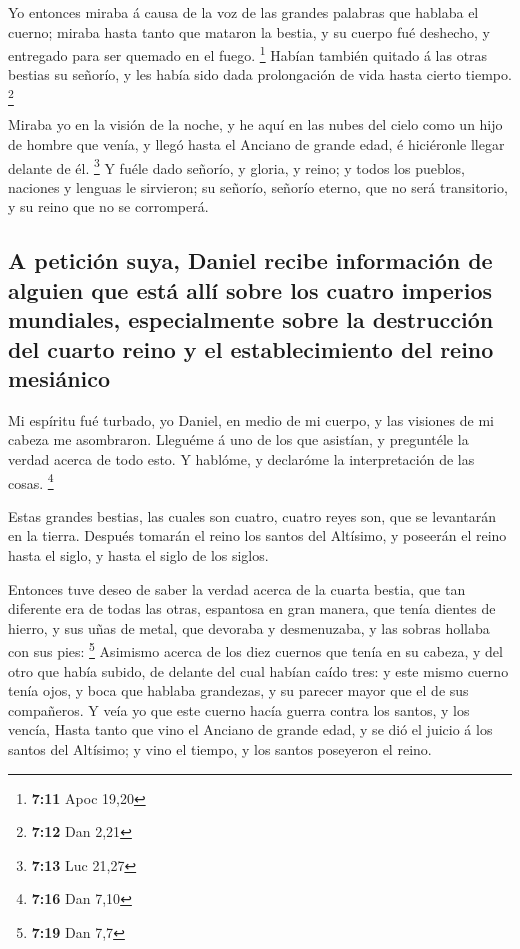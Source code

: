  Yo entonces miraba á causa de la voz de las grandes
palabras que hablaba el cuerno; miraba hasta tanto que mataron la
bestia, y su cuerpo fué deshecho, y entregado para ser quemado en el
fuego. \footnote{\textbf{7:11} Apoc 19,20}  Habían
también quitado á las otras bestias su señorío, y les había sido dada
prolongación de vida hasta cierto tiempo. \footnote{\textbf{7:12} Dan
  2,21}

 Miraba yo en la visión de la noche, y he aquí en las
nubes del cielo como un hijo de hombre que venía, y llegó hasta el
Anciano de grande edad, é hiciéronle llegar delante de él. \footnote{\textbf{7:13}
  Luc 21,27}  Y fuéle dado señorío, y gloria, y reino; y
todos los pueblos, naciones y lenguas le sirvieron; su señorío, señorío
eterno, que no será transitorio, y su reino que no se corromperá.

\hypertarget{a-peticiuxf3n-suya-daniel-recibe-informaciuxf3n-de-alguien-que-estuxe1-alluxed-sobre-los-cuatro-imperios-mundiales-especialmente-sobre-la-destrucciuxf3n-del-cuarto-reino-y-el-establecimiento-del-reino-mesiuxe1nico}{%
\subsection{A petición suya, Daniel recibe información de alguien que
está allí sobre los cuatro imperios mundiales, especialmente sobre la
destrucción del cuarto reino y el establecimiento del reino
mesiánico}\label{a-peticiuxf3n-suya-daniel-recibe-informaciuxf3n-de-alguien-que-estuxe1-alluxed-sobre-los-cuatro-imperios-mundiales-especialmente-sobre-la-destrucciuxf3n-del-cuarto-reino-y-el-establecimiento-del-reino-mesiuxe1nico}}

 Mi espíritu fué turbado, yo Daniel, en medio de mi
cuerpo, y las visiones de mi cabeza me asombraron. 
Lleguéme á uno de los que asistían, y preguntéle la verdad acerca de
todo esto. Y hablóme, y declaróme la interpretación de las cosas.
\footnote{\textbf{7:16} Dan 7,10}

 Estas grandes bestias, las cuales son cuatro, cuatro
reyes son, que se levantarán en la tierra.  Después
tomarán el reino los santos del Altísimo, y poseerán el reino hasta el
siglo, y hasta el siglo de los siglos.

 Entonces tuve deseo de saber la verdad acerca de la
cuarta bestia, que tan diferente era de todas las otras, espantosa en
gran manera, que tenía dientes de hierro, y sus uñas de metal, que
devoraba y desmenuzaba, y las sobras hollaba con sus pies: \footnote{\textbf{7:19}
  Dan 7,7}  Asimismo acerca de los diez cuernos que tenía
en su cabeza, y del otro que había subido, de delante del cual habían
caído tres: y este mismo cuerno tenía ojos, y boca que hablaba
grandezas, y su parecer mayor que el de sus compañeros. 
Y veía yo que este cuerno hacía guerra contra los santos, y los vencía,
 Hasta tanto que vino el Anciano de grande edad, y se dió
el juicio á los santos del Altísimo; y vino el tiempo, y los santos
poseyeron el reino.

